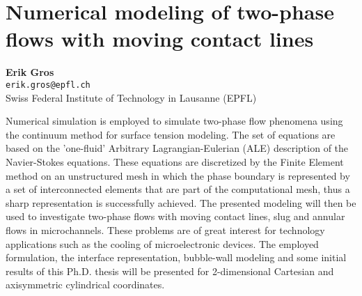 
\section{Numerical modeling of two-phase flows with moving contact lines}

\textbf{Erik Gros}\\
\texttt{\small{erik.gros@epfl.ch}}\\
Swiss Federal Institute of Technology in Lausanne (EPFL)

Numerical simulation is employed to simulate two-phase flow phenomena using the continuum method for surface tension modeling. The set of equations are based on the ’one-fluid’ Arbitrary Lagrangian-Eulerian (ALE) description of the Navier-Stokes equations. These equations are discretized by the Finite Element method on an unstructured mesh in which the phase boundary is represented by a set of interconnected elements that are part of the computational mesh, thus a sharp representation is successfully achieved. The presented modeling will then be used to investigate two-phase flows with moving contact lines, slug and annular flows in microchannels. These problems are of great interest for technology applications such as the cooling of microelectronic devices. The employed formulation, the interface representation, bubble-wall modeling and some initial results of this Ph.D. thesis will be presented for 2-dimensional Cartesian and axisymmetric cylindrical coordinates.

